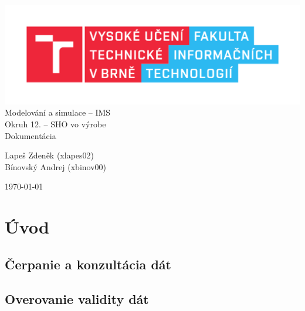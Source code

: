 \documentclass[a4paper, 10pt]{article}
\begin{document}
    \begin{titlepage}
        \begin{center}
            \includegraphics[width=0.77\linewidth]{src/FIT_logo} \\
            \Huge{Modelování a simulace -- IMS} \\
            \huge{Okruh 12. -- SHO vo výrobe} \\
            \Large{Dokumentácia}
        \end{center}

        \begin{flushleft}
            \Large{Lapeš Zdeněk (xlapes02)} \\
            \Large{Bínovský Andrej (xbinov00)}
        \end{flushleft}
        \vspace{-12mm}
        \hfill\Large{\today}
    \end{titlepage}


    \tableofcontents
    \newpage

    \section{Úvod}
        \subsection{Čerpanie a konzultácia dát}

        \subsection{Overovanie validity dát}


\end{document}
